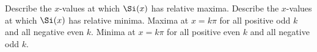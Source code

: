 {Describe the $x$-values at which $\Si(x)$ has relative maxima.  Describe the $x$-values at which $\Si(x)$ has relative minima.
}
{Maxima at $x=k\pi$ for all positive odd $k$ and all negative even $k$.  Minima at $x=k\pi$ for all positive even $k$ and all negative odd $k$.
}